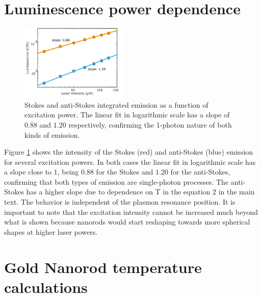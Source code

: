 \documentclass[journal=nalefd,manuscript=letter]{achemso}
\begin{document}
\section{Luminescence power dependence}

\begin{figure}[htp] \centering
\includegraphics[width=0.45\textwidth]{Figures/Supplementary/03_AS_S_in_Log/03_AS_S_in_Log.png}
\caption{Stokes and anti-Stokes integrated emission as a function of excitation power. The
linear fit in logarithmic scale has a slope of $0.88$ and $1.20$ respectively,
confirming the 1-photon nature of both kinds of emission.}
	\label{fig:Log_Plot}
\end{figure}

Figure \ref{fig:Log_Plot} shows the intensity of the Stokes (red) and
anti-Stokes (blue) emission for several excitation powers. In both cases the
linear fit in logarithmic scale has a slope close to $1$, being $0.88$ for the
Stokes and $1.20$ for the anti-Stokes, confirming that both types of emission
are single-photon processes. The anti-Stokes has a higher slope due to dependence on T in the 
equation 2 in the main text. The behavior is independent of the plasmon
resonance position. It is important to note that the excitation intensity cannot
be increased much beyond what is shown because nanorods would start reshaping
towards more spherical shapes at higher laser powers.



\section{Gold Nanorod temperature calculations} \label{sec:temp-calc}
\end{document}
